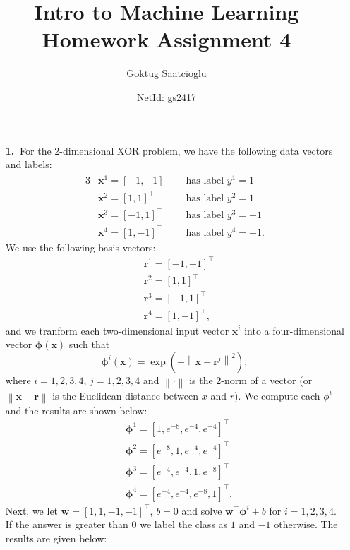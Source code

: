 \documentclass [10pt]{article}
\newcommand{\norm}[1]{\left\lVert#1\right\rVert}
\begin{document}
\title{Intro to Machine Learning Homework Assignment 4}
\author{Goktug Saatcioglu}
\date{NetId: gs2417}
\maketitle

\begin{enumerate}
	\item[\textbf{1.$\>$}]For the 2-dimensional XOR problem, we have the following data vectors and labels:
	\begin{alignat}{3}
		&\textbf{x}^{1} = [-1,-1]^{\top} && \text{has label $y^{1} = 1$} \nonumber \\
		&\textbf{x}^{2} = [1,1]^{\top} && \text{has label $y^{2} = 1$} \nonumber \\
		&\textbf{x}^{3} = [-1,1]^{\top} && \text{has label $y^{3} = -1$} \nonumber \\
		&\textbf{x}^{4} = [1,-1]^{\top} && \text{has label $y^{4} = -1$}. \nonumber
	\end{alignat}
	We use the following basis vectors:
	\begin{align}
		&\textbf{r}^{1} = [-1,-1]^{\top} \nonumber \\
		&\textbf{r}^{2} = [1,1]^{\top} \nonumber \\
		&\textbf{r}^{3} = [-1,1]^{\top} \nonumber \\
		&\textbf{r}^{4} = [1,-1]^{\top}, \nonumber
	\end{align}
	and we tranform each two-dimensional input vector $\textbf{x}^{i}$ into a four-dimensional vector $\boldsymbol{\phi}(\textbf{x})$ such that$$\boldsymbol{\phi}^{i}(\textbf{x})=\exp(-\norm{\textbf{x}-\textbf{r}^{j}}^{2}),$$where $i=1,2,3,4$, $j=1,2,3,4$ and $\norm{\cdot}$ is the 2-norm of a vector (or $\norm{\textbf{x}-\textbf{r}}$ is the Euclidean distance between $x$ and $r$). We compute each $\phi^{i}$ and the results are shown below:
	\begin{align}
		&\boldsymbol{\phi}^{1} = [1,e^{-8},e^{-4},e^{-4}]^{\top} \nonumber \\
		&\boldsymbol{\phi}^{2} = [e^{-8},1,e^{-4},e^{-4}]^{\top} \nonumber \\
		&\boldsymbol{\phi}^{3} = [e^{-4},e^{-4},1,e^{-8}]^{\top} \nonumber \\
		&\boldsymbol{\phi}^{4} = [e^{-4},e^{-4},e^{-8},1]^{\top}. \nonumber
	\end{align}
	Next, we let $\textbf{w}=[1,1,-1,-1]^{\top}$, $b=0$ and solve $\textbf{w}^{\top}\boldsymbol{\phi}^{i}+b$ for $i=1,2,3,4$. If the answer is greater than $0$ we label the class as $1$ and $-1$ otherwise. The results are given below:

\end{enumerate}
\end{document}
